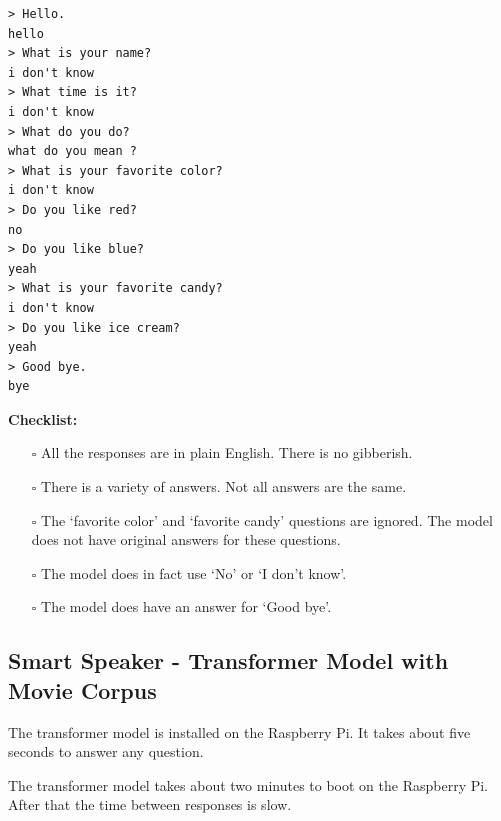 \begin{verbatim}
> Hello.
hello 
> What is your name?
i don't know 
> What time is it?
i don't know 
> What do you do?
what do you mean ?
> What is your favorite color?
i don't know 
> Do you like red?
no 
> Do you like blue?
yeah 
> What is your favorite candy?
i don't know 
> Do you like ice cream?
yeah 
> Good bye.
bye 
\end{verbatim}

\noindent \textbf{Checklist:} 

\begin{itemize}
	
	\item[\rlap{\raisebox{0.3ex}{\hspace{0.4ex}\scriptsize \ding{52}}}$\square$] All the responses are in plain English. There is no gibberish.
	
	\item[\rlap{\raisebox{0.3ex}{\hspace{0.4ex}\scriptsize \ding{52}}}$\square$] There is a variety of answers. Not all answers are the same.
	
	\item[\rlap{\raisebox{0.3ex}{\hspace{0.4ex}\scriptsize \ding{56}}}$\square$] The `favorite color' and `favorite candy' questions are ignored. The model does not have original answers for these questions.
	
	\item[\rlap{\raisebox{0.3ex}{\hspace{0.4ex}\scriptsize \ding{56}}}$\square$] The model does in fact use `No' or `I don't know'. %
	
	\item[\rlap{\raisebox{0.3ex}{\hspace{0.4ex}\scriptsize \ding{52}}}$\square$] The model does have an answer for `Good bye'.
\end{itemize}

\subsection{Smart Speaker - Transformer Model with Movie Corpus}

The transformer model is installed on the Raspberry Pi. It takes about five seconds to answer any question.

The transformer model takes about two minutes to boot on the Raspberry Pi. After that the time between responses is slow. 

